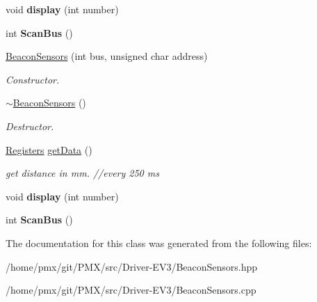 \begin{DoxyCompactItemize}
void {\bfseries display} (int number)
\item 
\mbox{\label{classBeaconSensors_abfdaa6bfe44e4fff7eccee320ab1a098}} 
int {\bfseries Scan\+Bus} ()
\item 
\mbox{\label{classBeaconSensors_ae88c123cdeac6ee17c034a239bd38705}} 
\hyperlink{classBeaconSensors_ae88c123cdeac6ee17c034a239bd38705}{Beacon\+Sensors} (int bus, unsigned char address)
\begin{DoxyCompactList}\small\item\em Constructor. \end{DoxyCompactList}\item 
\mbox{\label{classBeaconSensors_af3000d9ede6ec7c440320cccdca98a96}} 
\hyperlink{classBeaconSensors_af3000d9ede6ec7c440320cccdca98a96}{$\sim$\+Beacon\+Sensors} ()
\begin{DoxyCompactList}\small\item\em Destructor. \end{DoxyCompactList}\item 
\mbox{\label{classBeaconSensors_a0fc052c2c3d6236020384847f1dd8d53}} 
\hyperlink{structRegisters}{Registers} \hyperlink{classBeaconSensors_a0fc052c2c3d6236020384847f1dd8d53}{get\+Data} ()
\begin{DoxyCompactList}\small\item\em get distance in mm. //every 250 ms \end{DoxyCompactList}\item 
\mbox{\label{classBeaconSensors_a1b1f41a7637ff58ccabc17fccb22b87c}} 
void {\bfseries display} (int number)
\item 
\mbox{\label{classBeaconSensors_abfdaa6bfe44e4fff7eccee320ab1a098}} 
int {\bfseries Scan\+Bus} ()
\end{DoxyCompactItemize}


The documentation for this class was generated from the following files\+:\begin{DoxyCompactItemize}
\item 
/home/pmx/git/\+P\+M\+X/src/\+Driver-\/\+E\+V3/Beacon\+Sensors.\+hpp\item 
/home/pmx/git/\+P\+M\+X/src/\+Driver-\/\+E\+V3/Beacon\+Sensors.\+cpp\end{DoxyCompactItemize}
